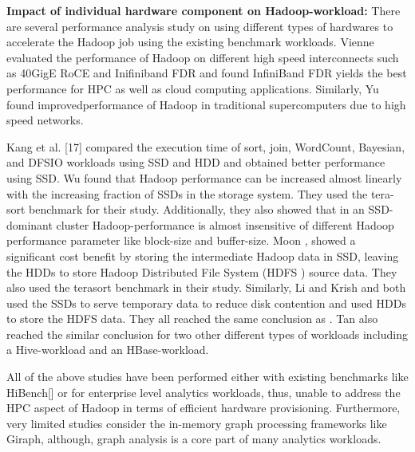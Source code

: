 \documentclass[conference]{IEEEtran}
\begin{document}
\textbf{Impact of individual hardware component on Hadoop-workload:}
There are several performance analysis study on using different types of hardwares to accelerate the Hadoop job using the existing benchmark workloads.
Vienne \cite{ethib:vienne} evaluated the performance of Hadoop on different high speed interconnects such as 40GigE RoCE and Inifiniband FDR and found InfiniBand FDR yields the best performance for HPC as well as cloud computing applications.
Similarly, Yu \cite{ethib:yu} found improvedperformance of Hadoop in traditional supercomputers due to high speed networks.

Kang et al. [17] compared the execution time of sort, join, WordCount, Bayesian, and DFSIO workloads using SSD and HDD and obtained better performance using SSD.
Wu \cite{ssdhdd:wu} found that Hadoop performance can be increased almost linearly with the increasing fraction of SSDs in the storage system. They used the tera-sort benchmark for their study. Additionally, they also showed that in an SSD-dominant cluster Hadoop-performance is almost insensitive of different Hadoop performance parameter like block-size and buffer-size.
Moon \cite{ssdhdd:moon}, showed a significant cost benefit by storing the intermediate Hadoop data in SSD, leaving the HDDs to store Hadoop Distributed File System (HDFS \cite{fw:hdfs}) source data. They also used the terasort benchmark in their study.
Similarly, Li and Krish and both used the SSDs to serve temporary data to reduce disk contention and used HDDs to store the HDFS data. They all reached the same conclusion as \cite{ssdhdd:moon}.  
Tan \cite{ssdhdd:tan} also reached the similar conclusion for two other different types of workloads including a Hive-workload and an HBase-workload.

All of the above studies have been performed either with existing benchmarks like HiBench[] or for enterprise level analytics workloads, thus, unable to address the HPC aspect of Hadoop in terms of efficient hardware provisioning.
Furthermore, very limited studies consider the in-memory graph processing frameworks like Giraph, although, graph analysis is a core part of many analytics workloads.
\end{document}
